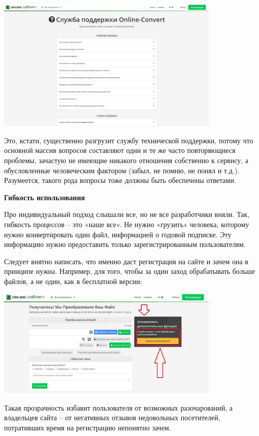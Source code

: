 \begin{center}
    \includegraphics[width=0.8\textwidth]{img/cxp10.jpg}
\end{center}

Это, кстати, существенно разгрузит службу технической поддержки, потому что основной массив вопросов составляют одни и те же часто повторяющиеся проблемы, зачастую не имеющие никакого отношения собственно к сервису, а обусловленные человеческим фактором (забыл, не помню, не понял и т.д.). Разумеется, такого рода вопросы тоже должны быть обеспечены ответами.

\textbf{Гибкость использования}

Про индивидуальный подход слышали все, но не все разработчики вняли. Так, гибкость процессов – это «наше все». Не нужно «грузить» человека, которому нужно конвертировать один файл, информацией о годовой подписке. Эту информацию нужно предоставить только зарегистрированным пользователям.

Следует внятно написать, что именно даст регистрация на сайте и зачем она в принципе нужна. Например, для того, чтобы за один заход обрабатывать больше файлов, а не один, как в бесплатной версии:

\begin{center}
    \includegraphics[width=0.8\textwidth]{img/cxp11.jpg}
\end{center}

Такая прозрачность избавит пользователя от возможных разочарований, а владельцев сайта – от негативных отзывов недовольных посетителей, потративших время на регистрацию непонятно зачем.

